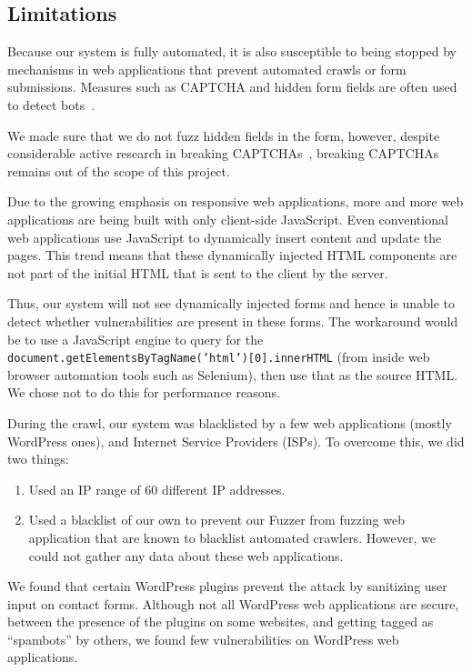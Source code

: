\subsection[Limitations]{Limitations}
\label{limitations}

		Because our system is fully automated, it is also susceptible to being stopped by mechanisms in web applications that prevent automated crawls or form submissions. Measures such as CAPTCHA and hidden form fields are often used to detect bots~\cite{captchas3, captchas2}.

		We made sure that we do not fuzz hidden fields in the form, however, despite considerable active research in breaking CAPTCHAs~\cite{captchas2, captchas}, breaking CAPTCHAs remains out of the scope of this project.

	   Due to the growing emphasis on responsive web applications, more and more web applications are being built with only client-side  JavaScript. Even conventional web applications use JavaScript to dynamically insert content and update the pages. This trend means that these dynamically injected HTML components are not part of the initial HTML that is sent to the client by the server.

		Thus, our system will not see dynamically injected forms and hence is unable to detect whether \ehi vulnerabilities are present in these forms. The workaround would be to use a JavaScript engine to query for the \texttt{document.getElementsByTagName('html')[0].innerHTML} (from inside web browser automation tools such as Selenium), then use that as the source HTML. We chose not to do this for performance reasons. 

		During the crawl, our system was blacklisted by a few web applications (mostly WordPress ones), and Internet Service Providers (ISPs).
		To overcome this, we did two things:
		\begin{enumerate}
			\item Used an IP range of 60 different IP addresses.
			\item Used a blacklist of our own to prevent our Fuzzer from fuzzing web application that are known to blacklist automated crawlers.  However, we could not gather any data about these web applications.
		\end{enumerate}

		We found that certain WordPress plugins prevent the \ehi attack by sanitizing user input on contact forms. Although not all  WordPress web applications are secure, between the presence of the plugins on some websites, and getting tagged as ``spambots'' by others, we found few vulnerabilities on WordPress web applications.

